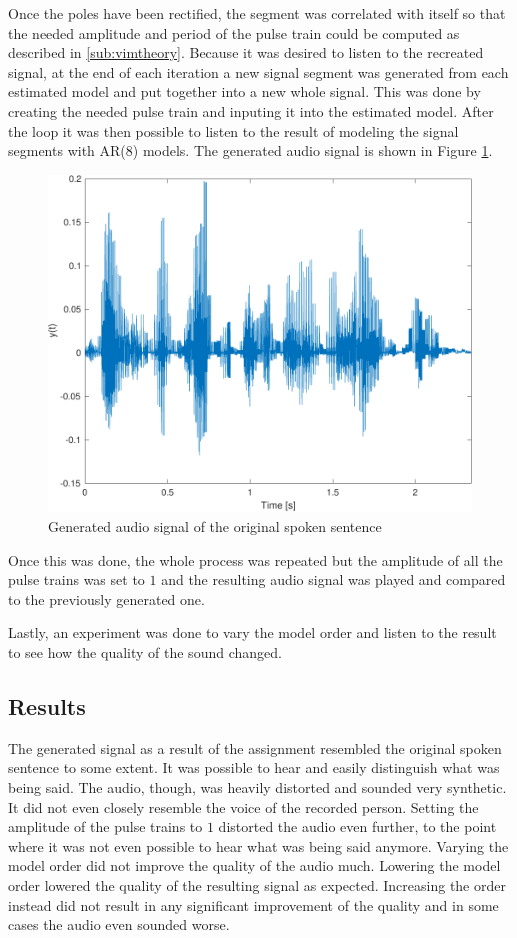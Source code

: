 \documentclass{IEEEtran}
\begin{document}
Once the poles
have been rectified, the segment was correlated with itself so that
the needed amplitude and period of the pulse train could be computed
as described in \ref{sub:vimtheory}. Because it was desired to listen
to the recreated signal, at the end of each iteration a new signal
segment was generated from each estimated model and put together into
a new whole signal. This was done by creating the needed pulse train
and inputing it into the estimated model. After the loop it was then
possible to listen to the result of modeling the signal segments with
AR(8) models. The generated audio signal is shown in Figure
\ref{3:genvim}.


\begin{figure}[h]
  \centering
  \captionsetup{justification=centering}

  \includegraphics[width=0.8\columnwidth]{pictures/vim_gen.pdf}
  \caption{Generated audio signal of the original spoken sentence}
  \label{3:genvim}

\end{figure}

Once this was done, the whole process was repeated but the amplitude
of all the pulse trains was set to $1$ and the resulting audio signal
was played and compared to the previously generated one.

Lastly, an experiment was done to vary the model order and listen to
the result to see how the quality of the sound changed.

\subsection{Results}
The generated signal as a result of the assignment resembled the
original spoken sentence to some extent. It was possible to hear and
easily distinguish what was being said. The audio, though, was heavily
distorted and sounded very synthetic. It did not even closely resemble
the voice of the recorded person. Setting the amplitude of the pulse trains
to $1$ distorted the audio even further, to the point where it was not
even possible to hear what was being said anymore. Varying the model order
did not improve the quality of the audio much. Lowering the model order
lowered the quality of the resulting signal as expected. Increasing the
order instead did not result in any significant improvement of the
quality and in some cases the audio even sounded worse.
\end{document}
